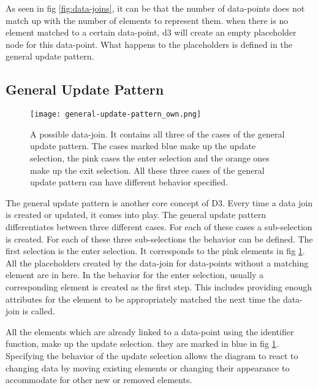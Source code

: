 As seen in fig \ref{fig:data-joins}, it can be that the number of data-points does not match up with the number of elements to represent them. when there is no element matched to a certain data-point, d3 will create an empty placeholder node for this data-point. What happens to the placeholders is defined in the general update pattern.

\subsection{General Update Pattern}


\begin{figure}
    \texttt{[image: general-update-pattern\_own.png]}
    \caption[general-update-pattern]{A possible data-join. It contains all three of the cases of the general update pattern. The cases marked blue make up the update selection, the pink cases the enter selection and the orange ones make up the exit selection. All these three cases of the general update pattern can have different behavior specified.}
    \label{fig:general-update-pattern}
\end{figure}



The general update pattern is another core concept of D3. Every time a data join is created or updated, it comes into play. The general update pattern differentiates between three different cases. For each of these cases a sub-selection is created. For each of these three sub-selections the behavior can be defined. The first selection is the enter selection. It corresponds to the pink elements in fig \ref{fig:general-update-pattern}. All the placeholders created by the data-join for data-points without a matching element are in here. In the behavior for the enter selection, usually a corresponding element is created as the first step. This includes providing enough attributes for the element to be appropriately matched the next time the data-join is called.

All the elements which are already linked to a data-point using the identifier function, make up the update selection. they are marked in blue in fig \ref{fig:general-update-pattern}. Specifying the behavior of the update selection allows the diagram to react to changing data by moving existing elements or changing their appearance to accommodate for other new or removed elements.

